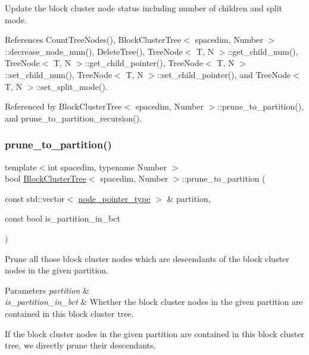 Update the block cluster node status including number of children and split mode.

References Count\+Tree\+Nodes(), Block\+Cluster\+Tree$<$ spacedim, Number $>$\+::decrease\+\_\+node\+\_\+num(), Delete\+Tree(), Tree\+Node$<$ T, N $>$\+::get\+\_\+child\+\_\+num(), Tree\+Node$<$ T, N $>$\+::get\+\_\+child\+\_\+pointer(), Tree\+Node$<$ T, N $>$\+::set\+\_\+child\+\_\+num(), Tree\+Node$<$ T, N $>$\+::set\+\_\+child\+\_\+pointer(), and Tree\+Node$<$ T, N $>$\+::set\+\_\+split\+\_\+mode().



Referenced by Block\+Cluster\+Tree$<$ spacedim, Number $>$\+::prune\+\_\+to\+\_\+partition(), and prune\+\_\+to\+\_\+partition\+\_\+recursion().

\mbox{\label{classBlockClusterTree_af1663a109b6fd5c67c85e9bb88a54a13}} 
\subsubsection{\texorpdfstring{prune\+\_\+to\+\_\+partition()}{prune\_to\_partition()}}
{\footnotesize\ttfamily template$<$int spacedim, typename Number $>$ \\
bool \hyperlink{classBlockClusterTree}{Block\+Cluster\+Tree}$<$ spacedim, Number $>$\+::prune\+\_\+to\+\_\+partition (\begin{DoxyParamCaption}\item[{const std\+::vector$<$ \hyperlink{classTreeNode}{node\+\_\+pointer\+\_\+type} $>$ \&}]{partition,  }\item[{const bool}]{is\+\_\+partition\+\_\+in\+\_\+bct }\end{DoxyParamCaption})}

Prune all those block cluster nodes which are descendants of the block cluster nodes in the given partition.


\begin{DoxyParams}{Parameters}
{\em partition} & \\
\hline
{\em is\+\_\+partition\+\_\+in\+\_\+bct} & Whether the block cluster nodes in the given {\ttfamily partition} are contained in this block cluster tree. \\
\hline
\end{DoxyParams}
If the block cluster nodes in the given {\ttfamily partition} are contained in this block cluster tree, we directly prune their descendants.


